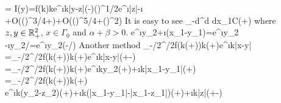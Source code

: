 \documentclass[12pt]{iopart}
\begin{document}
	=
	\ee
	\be
	I(y)=f(k\sin\phi)k\cos\phi e^{\i k|y-z|\cos(\phi-\eta)}()^{1/2}e^{\i|z|-\i{}}\\
	+O(\Bigg(\Bigg)^{3/4}+)+O(\Bigg(\Bigg)^{5/4}+\Bigg(\Bigg)^2)
	\ee
	It is easy to see
	\be
	\int_{-d}^{d} dx_1\leq C(+)
	\ee
	where $z,y\in{\mathbb{R}}^2_+$, $x\in\Gamma_0$ and $\alpha+\beta>0$.
	\be
	e^{\i \mu  y_2+\i\xi(x_1-y_1)}=e^{\i\mu y_2 -\i y_2/\tan\phi}=e^{\i y_2(\mu-\xi/\tan\phi)}
	\ee
	Another method
	\be
	\int_{-\pi/2}^{\pi/2}f(k\sin(\theta+\psi))k\cos(\theta+\psi)e^{\i k|x-y|\cos\theta}\\
	=\int_{-\pi/2}^{\pi/2}f(k\sin(\theta+\psi))k\cos(\theta+\psi)e^{\i k|x-y|\cos(\theta+\psi-\psi)} \\
	=\int_{-\pi/2}^{\pi/2}f(k\sin(\theta+\psi))k\cos(\theta+\psi)e^{\i ky_2\cos(\theta+\psi)+\i k|x_1-y_1|\sin(\theta+\psi)} \\
	=\int_{-\pi/2}^{\pi/2}f(k\sin(\theta+\psi))k\cos(\theta+\psi)\\
	e^{\i k(y_2-z_2)\cos(\theta+\psi)+\i k(|x_1-y_1|-|x_1-z_1|)\sin(\theta+\psi)+\i k|z|\cos(\theta+\psi-\phi)}
	\ee
\end{document}
